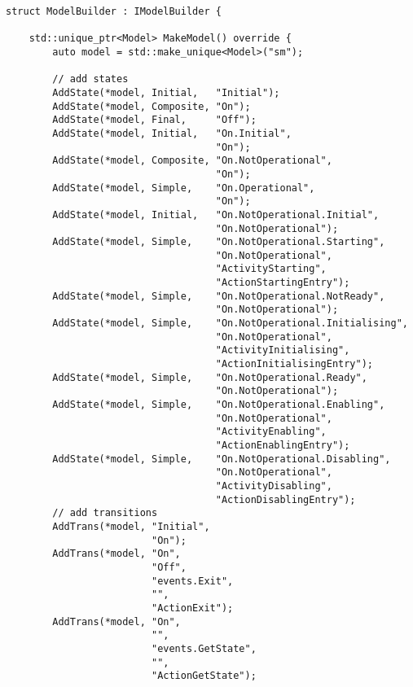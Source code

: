 \begin{lstlisting}[language=CXX, label={lst:annex_basic_model}, caption={Basic life cycle without omissions.}]
struct ModelBuilder : IModelBuilder {

    std::unique_ptr<Model> MakeModel() override {
        auto model = std::make_unique<Model>("sm");

        // add states
        AddState(*model, Initial,   "Initial");
        AddState(*model, Composite, "On");
        AddState(*model, Final,     "Off");
        AddState(*model, Initial,   "On.Initial",
                                    "On");
        AddState(*model, Composite, "On.NotOperational",
                                    "On");
        AddState(*model, Simple,    "On.Operational",
                                    "On");
        AddState(*model, Initial,   "On.NotOperational.Initial",
                                    "On.NotOperational");
        AddState(*model, Simple,    "On.NotOperational.Starting",
                                    "On.NotOperational",
                                    "ActivityStarting",
                                    "ActionStartingEntry");
        AddState(*model, Simple,    "On.NotOperational.NotReady",
                                    "On.NotOperational");
        AddState(*model, Simple,    "On.NotOperational.Initialising",
                                    "On.NotOperational",
                                    "ActivityInitialising",
                                    "ActionInitialisingEntry");
        AddState(*model, Simple,    "On.NotOperational.Ready",
                                    "On.NotOperational");
        AddState(*model, Simple,    "On.NotOperational.Enabling",
                                    "On.NotOperational",
                                    "ActivityEnabling",
                                    "ActionEnablingEntry");
        AddState(*model, Simple,    "On.NotOperational.Disabling",
                                    "On.NotOperational",
                                    "ActivityDisabling",
                                    "ActionDisablingEntry");
        // add transitions
        AddTrans(*model, "Initial",
                         "On");
        AddTrans(*model, "On",
                         "Off",
                         "events.Exit",
                         "",
                         "ActionExit");
        AddTrans(*model, "On",
                         "",
                         "events.GetState",
                         "",
                         "ActionGetState");

\end{lstlisting}

